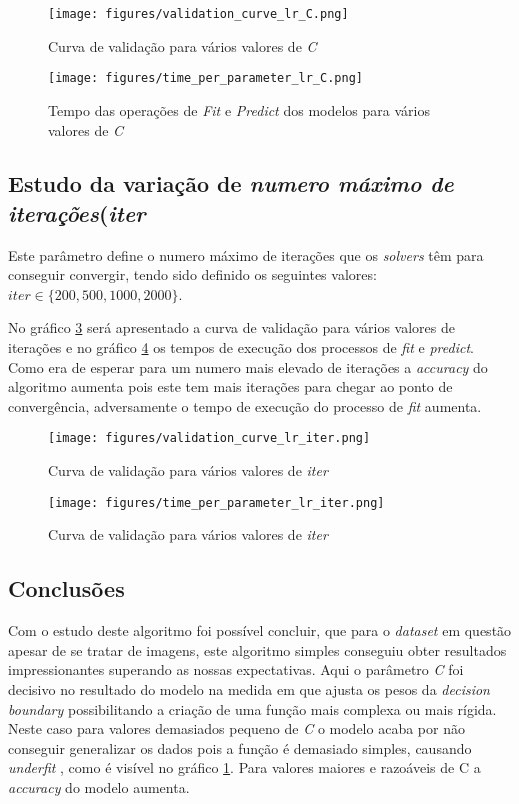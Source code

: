 \begin{figure}[htp]
\centering
\texttt{[image: figures/validation\_curve\_lr\_C.png]}
\caption{Curva de validação para vários valores de \textit{C}}
\label{fig:model_lr_C}
\end{figure}

\begin{figure}[htp]
\centering
\texttt{[image: figures/time\_per\_parameter\_lr\_C.png]}
\caption{Tempo das operações de \textit{Fit} e \textit{Predict} dos modelos para vários valores de \textit{C}}
\label{fig:time_operations_lr_C}
\end{figure}

\subsection{Estudo da variação de \textit{numero máximo de iterações}(\textit{iter}}

Este parâmetro define o numero máximo de iterações que os \textit{solvers} têm para conseguir convergir, tendo sido definido os seguintes valores: $\textit{iter} \in \{200, 500, 1000, 2000\}$. 

No gráfico \ref{fig:model_lr_iter} será apresentado a curva de validação para vários valores de iterações e no gráfico \ref{fig: time_operations_lr_iter} os tempos de execução dos processos de \textit{fit} e \textit{predict}.
Como era de esperar para um numero mais elevado de iterações a \textit{accuracy} do algoritmo aumenta pois este tem mais iterações para chegar ao ponto de convergência, adversamente o tempo de execução do processo de \textit{fit} aumenta.


\begin{figure}[htp]
\centering
\texttt{[image: figures/validation\_curve\_lr\_iter.png]}
\caption{Curva de validação para vários valores de \textit{iter}}
\label{fig:model_lr_iter}
\end{figure}


\begin{figure}[htp]
\centering
\texttt{[image: figures/time\_per\_parameter\_lr\_iter.png]}
\caption{Curva de validação para vários valores de \textit{iter}}
\label{fig: time_operations_lr_iter}
\end{figure}



\subsection{Conclusões}
Com o estudo deste algoritmo foi possível concluir, que para o \textit{dataset} em questão apesar de se tratar de imagens, este algoritmo simples conseguiu obter resultados impressionantes superando as nossas expectativas.
Aqui o parâmetro \textit{C} foi decisivo no resultado do modelo na medida em que ajusta os pesos da \textit{decision boundary} possibilitando a criação de uma função mais complexa ou mais rígida.
Neste caso para valores demasiados pequeno de \textit{C} o modelo acaba por não conseguir generalizar os dados pois a função é demasiado simples, causando \textit{underfit} , como é visível no gráfico \ref{fig:model_lr_C}. Para valores maiores e razoáveis de C a \textit{accuracy} do modelo aumenta.


